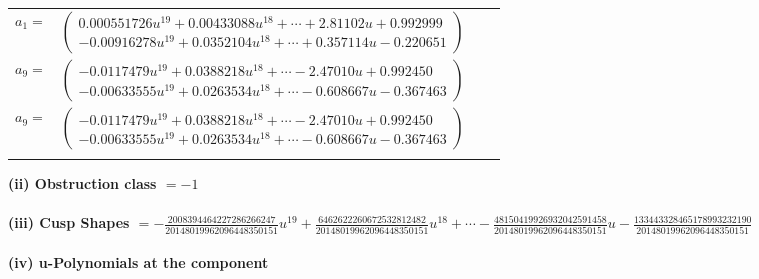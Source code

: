 \documentclass[1p]{elsarticle_modified}
\theoremstyle{definition}
\begin{document}
\begin{tabular}{m{7pt} m{180pt} m{7pt} m{180pt} }
\flushright $a_{1}=$&$\begin{pmatrix}0.000551726 u^{19}+0.00433088 u^{18}+\cdots+2.81102 u+0.992999\\-0.00916278 u^{19}+0.0352104 u^{18}+\cdots+0.357114 u-0.220651\end{pmatrix}$ \\
\flushright $a_{9}=$&$\begin{pmatrix}-0.0117479 u^{19}+0.0388218 u^{18}+\cdots-2.47010 u+0.992450\\-0.00633555 u^{19}+0.0263534 u^{18}+\cdots-0.608667 u-0.367463\end{pmatrix}$\\ \flushright $a_{9}=$&$\begin{pmatrix}-0.0117479 u^{19}+0.0388218 u^{18}+\cdots-2.47010 u+0.992450\\-0.00633555 u^{19}+0.0263534 u^{18}+\cdots-0.608667 u-0.367463\end{pmatrix}$\\&\end{tabular}
\flushleft \textbf{(ii) Obstruction class $= -1$}\\~\\
\flushleft \textbf{(iii) Cusp Shapes $= -\frac{2008394464227286266247}{20148019962096448350151} u^{19}+\frac{6462622260672532812482}{20148019962096448350151} u^{18}+\cdots-\frac{48150419926932042591458}{20148019962096448350151} u-\frac{133443328465178993232190}{20148019962096448350151}$}\\~\\
\newpage\renewcommand{\arraystretch}{1}
\flushleft \textbf{(iv) u-Polynomials at the component}\newline \\
\end{document}
